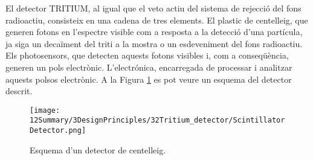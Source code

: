 El detector TRITIUM, al igual que el veto actiu del sistema de rejecció del fons radioactiu, consisteix en una cadena de tres elements. El plastic de centelleig, que generen fotons en l'espectre visible com a resposta a la detecció d'una partícula, ja siga un decaïment del triti a la mostra o un esdeveniment del fons radioactiu. Els photosensors, que detecten aquests fotons visibles i, com a conseqüència, generen un pols electrònic. L'electrónica, encarregada de processar i analitzar aquests polsos electrònic. A la Figura \ref{fig:EsquemaDetector} es pot veure un esquema del detector descrit.

\begin{figure}[hbtp]
\texttt{[image: 12Summary/3DesignPrinciples/32Tritium\_detector/ScintillatorDetector.png]}
\centering
\caption{Esquema d'un detector de centelleig.\label{fig:EsquemaDetector}}
\end{figure}